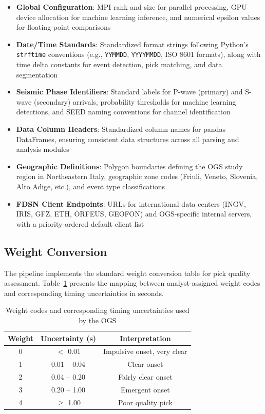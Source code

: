 \begin{itemize}
  \item \textbf{Global Configuration}: MPI rank and size for parallel
    processing, GPU device allocation for machine learning inference, and
    numerical epsilon values for floating-point comparisons

  \item \textbf{Date/Time Standards}: Standardized format strings following
    Python's \texttt{strftime} conventions (e.g., \texttt{YYMMDD},
    \texttt{YYYYMMDD}, ISO 8601 formats), along with time delta constants for
    event detection, pick matching, and data segmentation

  \item \textbf{Seismic Phase Identifiers}: Standard labels for P-wave
    (primary) and S-wave (secondary) arrivals, probability thresholds for
    machine learning detections, and SEED naming conventions for channel
    identification

  \item \textbf{Data Column Headers}: Standardized column names for pandas
    DataFrames, ensuring consistent data structures across all parsing and
    analysis modules

  \item \textbf{Geographic Definitions}: Polygon boundaries defining the OGS
    study region in Northeastern Italy, geographic zone codes (Friuli, Veneto,
    Slovenia, Alto Adige, etc.), and event type classifications

  \item \textbf{FDSN Client Endpoints}: URLs for international data centers
    (INGV, IRIS, GFZ, ETH, ORFEUS, GEOFON) and OGS-specific internal servers,
    with a priority-ordered default client list
\end{itemize}

\subsection{Weight Conversion}
The pipeline implements the standard weight conversion table for pick quality
assessment. Table~\ref{tab:h71_weights} presents the mapping between
analyst-assigned weight codes and corresponding timing uncertainties in
seconds.

\begin{table}[h]
  \centering
  \caption{Weight codes and corresponding timing uncertainties used by the OGS}
  \label{tab:h71_weights}
  \begin{tabular}{ccc}
    \hline
    \textbf{Weight} & \textbf{Uncertainty (s)} & \textbf{Interpretation} \\
    \hline
    0 & $<$ 0.01 & Impulsive onset, very clear \\
    1 & 0.01 -- 0.04 & Clear onset \\
    2 & 0.04 -- 0.20 & Fairly clear onset \\
    3 & 0.20 -- 1.00 & Emergent onset \\
    4 & $\geq$ 1.00 & Poor quality pick \\
    \hline
  \end{tabular}
\end{table}

